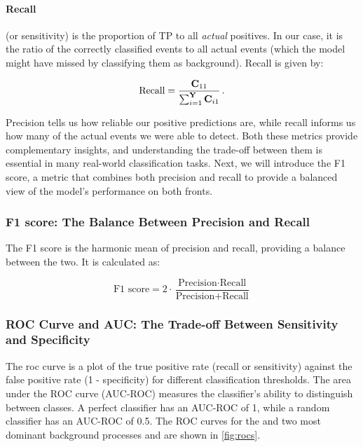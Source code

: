 \paragraph{Recall} (or sensitivity) is the proportion of TP to all \emph{actual} positives. In our case, it is the ratio
of the correctly classified \tth events to all actual \tth events (which the model might have missed by classifying them
as background). Recall is given by:

\begin{align}
    \text{Recall} = \frac{\mathbf{C}_{11}}{\sum_{i=1}^{\textbf{Y}} \mathbf{C}_{i1}}\,.
\end{align}

Precision tells us how reliable our positive predictions are,
while recall informs us how many of the actual \tth events we were able to detect. Both these metrics provide
complementary insights, and understanding the trade-off between them is essential in many real-world classification
tasks. Next, we will introduce the F1 score, a metric that combines both precision and recall to provide a balanced view
of the model's performance on both fronts.

\subsubsection{F1 score: The Balance Between Precision and Recall}

The F1 score is the harmonic mean of precision and recall, providing a balance between the two. It is calculated as:

\begin{equation}
    \text{F1 score} = 2 \cdot \frac{\text{Precision} \cdot \text{Recall}}{\text{Precision} + \text{Recall}}
\end{equation}

\subsubsection{ROC Curve and AUC: The Trade-off Between Sensitivity and Specificity}

The \gls{roc} curve is a plot of the true positive rate (recall or sensitivity) against
the false positive rate (1 - specificity) for different classification thresholds. The area under the ROC curve
(AUC-ROC) measures the classifier's ability to distinguish between classes. A perfect classifier has an AUC-ROC of 1,
while a random classifier has an AUC-ROC of 0.5. The ROC curves for the \tth and two most dominant background processes
\ttw and \ttz are shown in \autoref{fig:rocs}.

